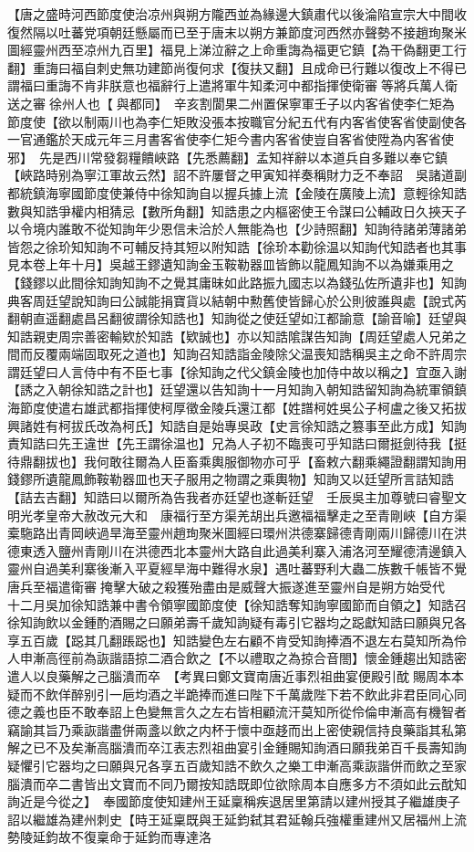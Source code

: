 【唐之盛時河西節度使治凉州與朔方隴西並為緣邊大鎮肅代以後淪陷宣宗大中間收復然隔以吐蕃党項朝廷懸屬而已至于唐末以朔方兼節度河西然亦聲勢不接趙珣聚米圖經靈州西至凉州九百里】福見上涕泣辭之上命重誨為福更它鎮【為干偽翻更工行翻】重誨曰福自刺史無功建節尚復何求【復扶又翻】且成命已行難以復改上不得已謂福曰重誨不肯非朕意也福辭行上遣將軍牛知柔河中都指揮使衛審等將兵萬人衛送之審徐州人也【與都同】　辛亥割閬果二州置保寧軍壬子以内客省使李仁矩為節度使【欲以制兩川也為李仁矩敗没張本按職官分紀五代有内客省使客省使副使各一官通鑑於天成元年三月書客省使李仁矩今書内客省使豈自客省使陞為内客省使邪】　先是西川常發芻糧饋峽路【先悉薦翻】孟知祥辭以本道兵自多難以奉它鎮【峽路時别為寧江軍故云然】詔不許屢督之甲寅知祥奏稱財力乏不奉詔　吳諸道副都統鎮海寧國節度使兼侍中徐知詢自以握兵據上流【金陵在廣陵上流】意輕徐知誥數與知誥爭權内相猜忌【數所角翻】知誥患之内樞密使王令謀曰公輔政日久挾天子以令境内誰敢不從知詢年少恩信未洽於人無能為也【少詩照翻】知詢待諸弟薄諸弟皆怨之徐玠知知詢不可輔反持其短以附知誥【徐玠本勸徐温以知詢代知誥者也其事見本卷上年十月】吳越王鏐遺知詢金玉鞍勒器皿皆飾以龍鳳知詢不以為嫌乘用之【錢鏐以此間徐知詢知詢不之覺其庸昧如此路振九國志以為錢弘佐所遺非也】知詢典客周廷望說知詢曰公誠能捐寶貨以結朝中勲舊使皆歸心於公則彼誰與處【說式芮翻朝直遥翻處昌呂翻彼謂徐知誥也】知詢從之使廷望如江都諭意【諭音喻】廷望與知誥親吏周宗善密輸欵於知誥【欵誠也】亦以知誥隂謀告知詢【周廷望處人兄弟之間而反覆兩端固取死之道也】知詢召知誥詣金陵除父温喪知誥稱吳主之命不許周宗謂廷望曰人言侍中有不臣七事【徐知詢之代父鎮金陵也加侍中故以稱之】宜亟入謝【誘之入朝徐知誥之計也】廷望還以告知詢十一月知詢入朝知誥留知詢為統軍領鎮海節度使遣右雄武都指揮使柯厚徵金陵兵還江都【姓譜柯姓吳公子柯盧之後又拓拔興諸姓有柯拔氏改為柯氏】知誥自是始專吳政【史言徐知誥之篡事至此方成】知詢責知誥曰先王違世【先王謂徐温也】兄為人子初不臨喪可乎知誥曰爾挺劍待我【挺待鼎翻拔也】我何敢往爾為人臣畜乘輿服御物亦可乎【畜敕六翻乘繩證翻謂知詢用錢鏐所遺龍鳳飾鞍勒器皿也天子服用之物謂之乘輿物】知詢又以廷望所言詰知誥【詰去吉翻】知誥曰以爾所為告我者亦廷望也遂斬廷望　壬辰吳主加尊號曰睿聖文明光孝皇帝大赦改元大和　康福行至方渠羌胡出兵邀福福擊走之至青剛峽【自方渠槖駞路出青岡峽過旱海至靈州趙珣聚米圖經曰環州洪德寨歸德青剛兩川歸德川在洪德東透入鹽州青剛川在洪德西北本靈州大路自此過美利寨入浦洛河至耀德清邊鎮入靈州自過美利寨後漸入平夏經旱海中難得水泉】遇吐蕃野利大蟲二族數千帳皆不覺唐兵至福遣衛審掩擊大破之殺獲殆盡由是威聲大振遂進至靈州自是朔方始受代　十二月吳加徐知誥兼中書令領寧國節度使【徐知誥奪知詢寧國節而自領之】知誥召徐知詢飲以金鍾酌酒賜之曰願弟壽千歲知詢疑有毒引它器均之跽獻知誥曰願與兄各享五百歲【跽其几翻䠆跽也】知誥變色左右顧不肯受知詢捧酒不退左右莫知所為伶人申漸高徑前為詼諧語掠二酒合飲之【不以禮取之為掠合音閤】懷金鍾趨出知誥密遣人以良藥解之己腦潰而卒　【考異曰鄭文寶南唐近事烈祖曲宴便殿引酖賜周本本疑而不飲佯醉别引一巵均酒之半跪捧而進曰陛下千萬歲陛下若不飲此非君臣同心同德之義也臣不敢奉詔上色變無言久之左右皆相顧流汗莫知所從伶倫申漸高有機智者竊諭其旨乃乘詼諧盡併兩盞以飲之内杯于懷中亟趍而出上密使親信持良藥詣其私第解之已不及矣漸高腦潰而卒江表志烈祖曲宴引金鍾賜知詢酒曰願我弟百千長壽知詢疑懼引它器均之曰願與兄各享五百歲知誥不飲久之樂工申漸高乘詼諧併而飲之至家腦潰而卒二書皆出文寶而不同乃爾按知誥既即位欲除周本自應多方不須如此云酖知詢近是今從之】　奉國節度使知建州王延稟稱疾退居里第請以建州授其子繼雄庚子詔以繼雄為建州刺史【時王延稟既與王延鈞弑其君延翰兵強權重建州又居福州上流勢陵延鈞故不復稟命于延鈞而專達洛